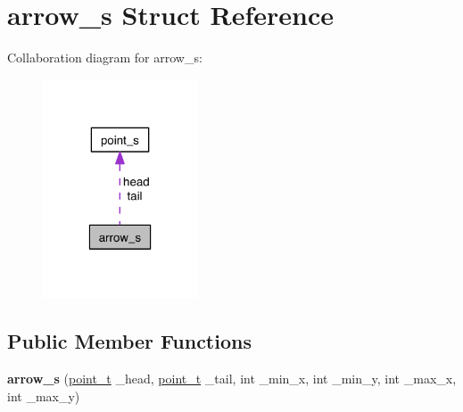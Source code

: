 \hypertarget{structarrow__s}{\section{arrow\-\_\-s Struct Reference}
\label{structarrow__s}
}


Collaboration diagram for arrow\-\_\-s\-:
\nopagebreak
\begin{figure}[H]
\begin{center}
\leavevmode
\includegraphics[width=130pt]{structarrow__s__coll__graph}
\end{center}
\end{figure}
\subsection*{Public Member Functions}
\begin{DoxyCompactItemize}
\item 
\hypertarget{structarrow__s_adc3cec0afccbbee7125798c1bf6c87e6}{{\bfseries arrow\-\_\-s} (\hyperlink{structpoint__s}{point\-\_\-t} \-\_\-head, \hyperlink{structpoint__s}{point\-\_\-t} \-\_\-tail, int \-\_\-min\-\_\-x, int \-\_\-min\-\_\-y, int \-\_\-max\-\_\-x, int \-\_\-max\-\_\-y)}\label{structarrow__s_adc3cec0afccbbee7125798c1bf6c87e6}

\end{DoxyCompactItemize}
